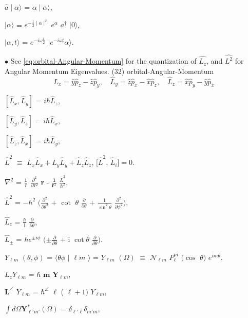 \documentclass[a4paper, 10pt, onepage]{elegantbook}
\begin{document}
{$\hat{a} \mid \alpha \rangle$ = $\alpha \mid \alpha \rangle$,  

$\mid \alpha \rangle$ = $e^{-{\frac{1}{2} \mid \alpha \mid^2}}$ $e^\alpha$ $a^\dagger$ $\mid 0 \rangle$,  

$\mid \alpha, t \rangle$ = $e^{-i \omega \frac{t}{2}}$ $\mid e^{-i \omega t} \alpha \rangle$.  

$\bullet$ See \eqref{eq:orbital-Angular-Momentum} for the quantization of $\hat{L_z}$, and $\hat{L^2}$ for Angular 
Momentum Eigenvalues. \quad
(32) orbital-Angular-Momentum 
\begin{equation}
\hat{L}_x = \hat{y} \hat{p}_z - \hat{z} \hat{p}_y, \quad \hat{L}_y = \hat{z} \hat{p}_x - \hat{x} \hat{p}_z, \quad 
\hat{L}_z = \hat{x} \hat{p}_y - \hat{y} \hat{p}_x
\end{equation}
\label{eq:orbital-Angular-Momentum}
\noindent

$[\hat{L}_x, \hat{L}_y]$ = $i \hbar \hat{L}_z$, 

$[\hat{L}_y, \hat{L}_z]$ = $i \hbar \hat{L}_x$, 

$[\hat{L}_z, \hat{L}_x]$ = $i \hbar \hat{L}_y$,  

$\hat{L}^2$ $\equiv$ $\hat{L}_x \hat{L}_x + \hat{L}_y \hat{L}_y + \hat{L}_z \hat{L}_z$, $[\hat{L}^2$, $\hat{L}_i] = 0$. 

$\nabla^2$ = $\frac{\mathbf 1} {r}$ $\frac{\partial^2}{\partial \mathbf r^2}$ $\mathbf r$ - $\frac{\mathbf 1} {\mathbf 
r^2}$ $\frac{\hat L^2} {\hbar^2}$,  

$\hat{L}^2$ = $- \hbar^2$ $(\frac{\partial^2}{\partial \theta^2}$ + $\cot$ $\theta$ $\frac{\partial}{\partial \theta}$ 
+ $\frac{1}{\sin^2 \theta}$ $\frac{\partial^2}{\partial \phi^2})$,  

$\hat{L}_z$ = $\frac{\hbar}{\mathbb i}$ $\frac{\partial}{\partial \theta}$,  

$\hat{L}_\pm$ = $\hbar e^{\pm i \phi}$ $(\pm\frac{\partial}{\partial \theta}$ + i $\cot \theta$ 
$\frac{\partial}{\partial \theta})$.  

$Y_{\ell m}$ $(\theta, \phi)$ = $\langle \theta \phi$ $\mid$  ${\ell m}$ $\rangle$ = $Y_{\ell m}$ $(\Omega)$ $\equiv$ 
$\mathcal N_{\ell m}$ $P^m_\ell$ $(\cos$ $\theta)$ $e^{i m \theta}$.  

$L_z Y_{\ell m}$ = $\hbar$ $\mathbf m$ $\mathbf Y_{\ell m}$, 

$\mathbf L^\angle$ $Y_{\ell m}$ = $\hbar^\angle$ $\ell$ ( $\ell + 1 )$ $Y_{\ell m}$, 

$\int d \Omega \mathbf Y^*_{\ell' m'} (\Omega)$ = $\delta_{\ell' \ell} \delta_{m' m}$,  

}
\end{document}
